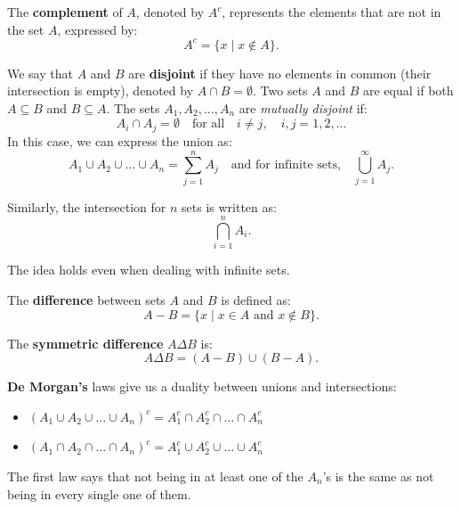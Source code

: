 \documentclass[12pt]{book}
\theoremstyle{definition}
\begin{document}
The \textbf{complement} of \(A\), denoted by \(A^c\), represents the elements that are not in the set \(A\), expressed by:
\begin{equation}
    A^c = \{ x \mid x \notin A \}.
\end{equation}

We say that \(A\) and \(B\) are \textbf{disjoint} if they have no elements in common (their intersection is empty), denoted by \(A \cap B = \emptyset\). Two sets \(A\) and \(B\) are equal if both \(A \subseteq B\) and \(B \subseteq A\). The sets \(A_1, A_2, \dots, A_n\) are \textit{mutually disjoint} if:
\begin{equation}
    A_i \cap A_j = \emptyset \quad \text{for all} \quad i \neq j, \quad i, j = 1, 2, \dots
\end{equation}
In this case, we can express the union as:
\begin{equation}
    A_1 \cup A_2 \cup \dots \cup A_n = \sum_{j=1}^{n} A_j \quad \text{and for infinite sets,} \quad \bigcup_{j=1}^{\infty} A_j.
\end{equation}

Similarly, the intersection for \(n\) sets is written as:
\begin{equation}
    \bigcap_{i=1}^{n} A_i.
\end{equation}

The idea holds even when dealing with infinite sets.

The \textbf{difference} between sets \(A\) and \(B\) is defined as:
\begin{equation}
    A - B = \{ x \mid x \in A \text{ and } x \notin B \}.
\end{equation}

The \textbf{symmetric difference} \(A \Delta B\) is:
\begin{equation}
    A \Delta B = (A - B) \cup (B - A).
\end{equation}

\textbf{De Morgan's} laws give us a duality between unions and intersections:
\begin{itemize}
    \item \((A_1 \cup A_2 \cup \dots \cup A_n)^c = A_1^c \cap A_2^c \cap \dots \cap A_n^c\)
    \item \((A_1 \cap A_2 \cap \dots \cap A_n)^c = A_1^c \cup A_2^c \cup \dots \cup A_n^c\)
\end{itemize}

The first law says that not being in at least one of the \(A_n\)'s is the same as not being in every single one of them.
\end{document}
